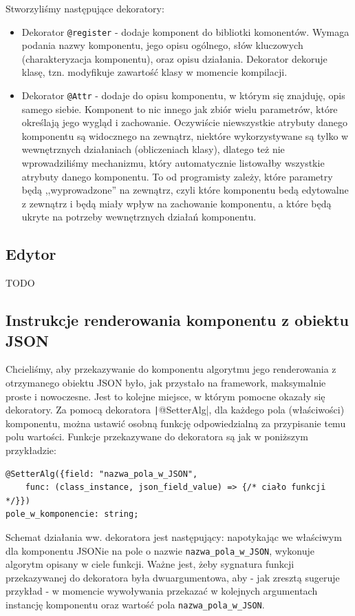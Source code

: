 \documentclass[licencjacka]{pracamgr}
\begin{document}
Stworzyliśmy następujące dekoratory:
\begin{itemize}
	\item Dekorator \texttt{@register} - dodaje komponent do bibliotki komonentów. Wymaga podania nazwy komponentu,
jego opisu ogólnego, słów kluczowych (charakteryzacja komponentu),
oraz opisu działania. Dekorator dekoruje klasę, tzn. modyfikuje zawartość
klasy w momencie kompilacji.

	\item Dekorator \texttt{@Attr} - dodaje do opisu komponentu, w którym się znajduję, opis samego siebie.
Komponent to nic innego jak zbiór wielu parametrów, które określają jego wygląd i zachowanie.
Oczywiście niewszystkie atrybuty danego komponentu są widocznego na zewnątrz, niektóre wykorzystywane
są tylko w wewnętrznych działaniach (obliczeniach klasy), dlatego też nie wprowadziliśmy mechanizmu, który
automatycznie listowałby wszystkie atrybuty danego komponentu. To od programisty
zależy, które parametry będą ,,wyprowadzone'' na zewnątrz, czyli które komponentu bedą edytowalne z zewnątrz
i będą miały wpływ na zachowanie komponentu, a które będą ukryte na potrzeby wewnętrznych działań komponentu.
\end{itemize}

\subsection{Edytor}
TODO

\subsection{Instrukcje renderowania komponentu z obiektu JSON}
Chcieliśmy, aby przekazywanie do komponentu algorytmu jego renderowania z otrzymanego obiektu JSON było, jak przystało na framework, maksymalnie proste i nowoczesne.
Jest to kolejne miejsce, w którym pomocne okazały się dekoratory. Za pomocą dekoratora \texttt|@SetterAlg|, dla każdego pola (właściwości) komponentu, można ustawić osobną funkcję odpowiedzialną za przypisanie temu polu wartości.
Funkcje przekazywane do dekoratora są jak w poniższym przykładzie:
\begin{verbatim}
@SetterAlg({field: "nazwa_pola_w_JSON", 
    func: (class_instance, json_field_value) => {/* ciało funkcji */}})
pole_w_komponencie: string;
\end{verbatim}

Schemat działania ww. dekoratora jest następujący: napotykając we właściwym dla komponentu JSONie na pole o nazwie
\texttt{nazwa_pola_w_JSON}, wykonuje algorytm opisany w ciele funkcji. Ważne jest, żeby sygnatura funkcji przekazywanej do dekoratora była dwuargumentowa, aby - jak zresztą sugeruje przykład - w momencie wywoływania przekazać w kolejnych argumentach instancję komponentu oraz wartość pola \texttt{nazwa_pola_w_JSON}.
\end{document}
